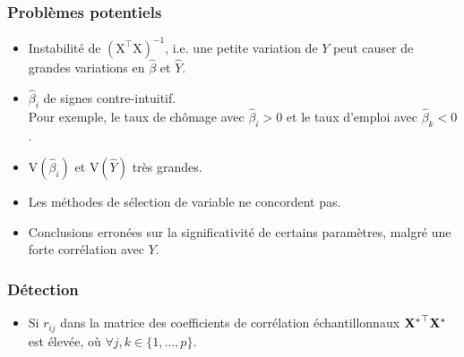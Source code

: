 \documentclass[10pt, french]{article}
\begin{document}
\begin{multicols*}{3}
\subsubsection*{Problèmes potentiels}
\begin{itemize}
\item Instabilité de $\mathrm{(X^\top X)^{-1}}$, i.e. une petite variation de $Y$ peut causer de grandes variations en $\hat{\beta}$ et $\hat{Y}$.
\item $\hat{\beta}_i$ de signes contre-intuitif.\\
 Pour exemple, le taux de chômage avec $\hat{\beta}_i > 0$ et le taux d'emploi avec $\hat{\beta}_k < 0$.
\item $\text{V}(\hat{\beta}_i)$ et $\text{V}(\hat{Y})$ très grandes.
\item Les méthodes de sélection de variable ne concordent pas.
\item Conclusions erronées sur la significativité de certains paramètres, malgré une forte corrélation avec $Y$.
\end{itemize}


\subsubsection*{Détection}
\begin{itemize}
\item Si $r_{ij}$ dans la matrice des coefficients de corrélation échantillonnaux $\mathbf{{X^*}^\top X^*}$ est élevée, où $\forall j,k \in \{1, \dots, p\}$.


\end{itemize}
\end{multicols*}
\end{document}

